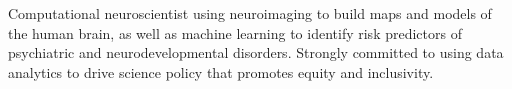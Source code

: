 

\begin{cvparagraph}

Computational neuroscientist using neuroimaging to build maps and models of the human brain, as well as machine learning to identify risk predictors of psychiatric and neurodevelopmental disorders. Strongly committed to using data analytics to drive science policy that promotes equity and inclusivity.

\end{cvparagraph}

